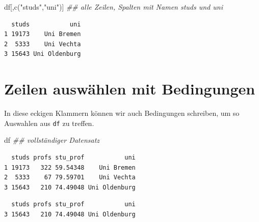\documentclass[
  letterpaper,
  DIV=11,
  numbers=noendperiod]{scrreprt}
\newenvironment{Shaded}{\begin{snugshade}}{\end{snugshade}}
\newcommand{\DecValTok}[1]{\textcolor[rgb]{0.68,0.00,0.00}{#1}}
\newcommand{\DocumentationTok}[1]{\textcolor[rgb]{0.37,0.37,0.37}{\textit{#1}}}
\newcommand{\FunctionTok}[1]{\textcolor[rgb]{0.28,0.35,0.67}{#1}}
\newcommand{\NormalTok}[1]{\textcolor[rgb]{0.00,0.46,0.62}{#1}}
\newcommand{\SpecialCharTok}[1]{\textcolor[rgb]{0.37,0.37,0.37}{#1}}
\newcommand{\StringTok}[1]{\textcolor[rgb]{0.13,0.47,0.30}{#1}}
\begin{document}
\begin{Shaded}
\begin{Highlighting}[]
\NormalTok{df[,}\FunctionTok{c}\NormalTok{(}\StringTok{"studs"}\NormalTok{,}\StringTok{"uni"}\NormalTok{)] }\DocumentationTok{\#\# alle Zeilen, Spalten mit Namen studs und uni}
\end{Highlighting}
\end{Shaded}

\begin{verbatim}
  studs           uni
1 19173    Uni Bremen
2  5333    Uni Vechta
3 15643 Uni Oldenburg
\end{verbatim}

\hypertarget{zeilen-auswuxe4hlen-mit-bedingungen}{%
\section{Zeilen auswählen mit
Bedingungen}\label{zeilen-auswuxe4hlen-mit-bedingungen}}

In diese eckigen Klammern können wir auch Bedingungen schreiben, um so
Auswahlen aus \texttt{df} zu treffen.

\begin{Shaded}
\begin{Highlighting}[]
\NormalTok{df }\DocumentationTok{\#\# vollständiger Datensatz}
\end{Highlighting}
\end{Shaded}

\begin{verbatim}
  studs profs stu_prof           uni
1 19173   322 59.54348    Uni Bremen
2  5333    67 79.59701    Uni Vechta
3 15643   210 74.49048 Uni Oldenburg
\end{verbatim}

\begin{Shaded}
\end{Shaded}

\begin{verbatim}
  studs profs stu_prof           uni
3 15643   210 74.49048 Uni Oldenburg
\end{verbatim}

\begin{Shaded}
\end{Shaded}
\end{document}
